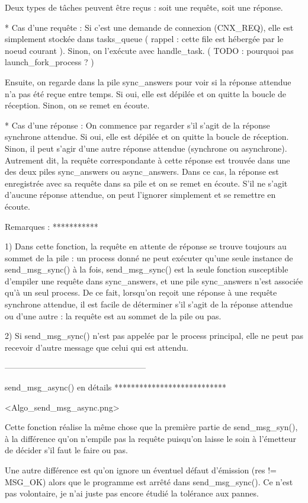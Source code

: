 Deux types de tâches peuvent être reçus : soit une requête, soit une réponse.

* Cas d'une requête :
  Si c'est une demande de connexion (CNX_REQ), elle est simplement stockée dans tasks_queue (
  rappel : cette file est hébergée par le noeud courant ).
  Sinon, on l'exécute avec handle_task. ( TODO : pourquoi pas launch_fork_process ? )

  Ensuite, on regarde dans la pile sync_answers pour voir si la réponse attendue n'a pas été reçue
  entre temps. Si oui, elle est dépilée et on quitte la boucle de réception. Sinon, on se remet en
  écoute.

* Cas d'une réponse :
  On commence par regarder s'il s'agit de la réponse synchrone attendue. Si oui, elle est dépilée et
  on quitte la boucle de réception.
  Sinon, il peut s'agir d'une autre réponse attendue (synchrone ou asynchrone). Autrement dit, la
  requête correspondante à cette réponse est trouvée dans une des deux piles sync_answers ou
  async_answers.
  Dans ce cas, la réponse est enregistrée avec sa requête dans sa pile et on se remet en écoute.
  S'il ne s'agit d'aucune réponse attendue, on peut l'ignorer simplement et se remettre en écoute.

Remarques :
***********

1)
Dans cette fonction, la requête en attente de réponse se trouve toujours au sommet de la pile :
un process donné ne peut exécuter qu'une seule instance de send_msg_sync() à la fois, send_msg_sync()
est la seule fonction susceptible d'empiler une requête dans sync_answers, et une pile sync_answers
n'est associée qu'à un seul process.
De ce fait, lorsqu'on reçoit une réponse à une requête synchrone attendue, il est facile de déterminer
s'il s'agit de la réponse attendue ou d'une autre : la requête est au sommet de la pile ou pas.

2)
Si send_msg_sync() n'est pas appelée par le process principal, elle ne peut pas recevoir d'autre
message que celui qui est attendu.

---------------------------------------------------


send_msg_async() en détails
***************************

<Algo_send_msg_async.png>

Cette fonction réalise la même chose que la première partie de send_msg_syn(), à la différence qu'on
n'empile pas la requête puisqu'on laisse le soin à l'émetteur de décider s'il faut le faire ou pas.

Une autre différence est qu'on ignore un éventuel défaut d'émission (res != MSG_OK) alors que le
programme est arrêté dans send_msg_sync(). Ce n'est pas volontaire, je n'ai juste pas encore étudié
la tolérance aux pannes.


